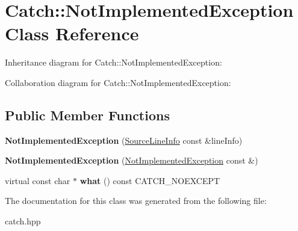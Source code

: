 \hypertarget{classCatch_1_1NotImplementedException}{}\section{Catch\+:\+:Not\+Implemented\+Exception Class Reference}
\label{classCatch_1_1NotImplementedException}


Inheritance diagram for Catch\+:\+:Not\+Implemented\+Exception\+:


Collaboration diagram for Catch\+:\+:Not\+Implemented\+Exception\+:
\subsection*{Public Member Functions}
\begin{DoxyCompactItemize}
\item 
{\bfseries Not\+Implemented\+Exception} (\hyperlink{structCatch_1_1SourceLineInfo}{Source\+Line\+Info} const \&line\+Info)\hypertarget{classCatch_1_1NotImplementedException_ab4f0a5c39d8ffb72c664e2c07e180634}{}\label{classCatch_1_1NotImplementedException_ab4f0a5c39d8ffb72c664e2c07e180634}

\item 
{\bfseries Not\+Implemented\+Exception} (\hyperlink{classCatch_1_1NotImplementedException}{Not\+Implemented\+Exception} const \&)\hypertarget{classCatch_1_1NotImplementedException_a508a7a833455da2d3c10ea1a9d45e982}{}\label{classCatch_1_1NotImplementedException_a508a7a833455da2d3c10ea1a9d45e982}

\item 
virtual const char $\ast$ {\bfseries what} () const C\+A\+T\+C\+H\+\_\+\+N\+O\+E\+X\+C\+E\+PT\hypertarget{classCatch_1_1NotImplementedException_ad4c13963f1a8feacda0cd331adda89e3}{}\label{classCatch_1_1NotImplementedException_ad4c13963f1a8feacda0cd331adda89e3}

\end{DoxyCompactItemize}


The documentation for this class was generated from the following file\+:\begin{DoxyCompactItemize}
\item 
catch.\+hpp\end{DoxyCompactItemize}
